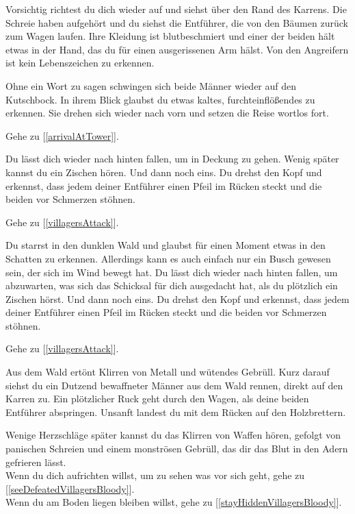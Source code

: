 
Vorsichtig richtest du dich wieder auf und siehst über den Rand des Karrens. Die Schreie haben aufgehört und du siehst die Entführer, die von den Bäumen zurück zum Wagen laufen. Ihre Kleidung ist blutbeschmiert und einer der beiden hält etwas in der Hand, das du für einen ausgerissenen Arm hälst. Von den Angreifern ist kein Lebenszeichen zu erkennen.

Ohne ein Wort zu sagen schwingen sich beide Männer wieder auf den Kutschbock. In ihrem Blick glaubst du etwas kaltes, furchteinflößendes zu erkennen. Sie drehen sich wieder nach vorn und setzen die Reise wortlos fort.

Gehe zu [\ref{arrivalAtTower}].


Du lässt dich wieder nach hinten fallen, um in Deckung zu gehen. Wenig später kannst du ein Zischen hören. Und dann noch eins. Du drehst den Kopf und erkennst, dass jedem deiner Entführer einen Pfeil im Rücken steckt und die beiden vor Schmerzen stöhnen.

Gehe zu [\ref{villagersAttack}].


Du starrst in den dunklen Wald und glaubst für einen Moment etwas in den Schatten zu erkennen. Allerdings kann es auch einfach nur ein Busch gewesen sein, der sich im Wind bewegt hat. Du lässt dich wieder nach hinten fallen, um abzuwarten, was sich das Schicksal für dich ausgedacht hat, als du plötzlich ein Zischen hörst. Und dann noch eins. Du drehst den Kopf und erkennst, dass jedem deiner Entführer einen Pfeil im Rücken steckt und die beiden vor Schmerzen stöhnen.

Gehe zu [\ref{villagersAttack}].


Aus dem Wald ertönt Klirren von Metall und wütendes Gebrüll. Kurz darauf siehst du ein Dutzend bewaffneter Männer aus dem Wald rennen, direkt auf den Karren zu. Ein plötzlicher Ruck geht durch den Wagen, als deine beiden Entführer abspringen. Unsanft landest du mit dem Rücken auf den Holzbrettern.

Wenige Herzschläge später kannst du das Klirren von Waffen hören, gefolgt von panischen Schreien und einem monströsen Gebrüll, das dir das Blut in den Adern gefrieren lässt.
\\Wenn du dich aufrichten willst, um zu sehen was vor sich geht, gehe zu [\ref{seeDefeatedVillagersBloody}].
\\Wenn du am Boden liegen bleiben willst, gehe zu [\ref{stayHiddenVillagersBloody}].

